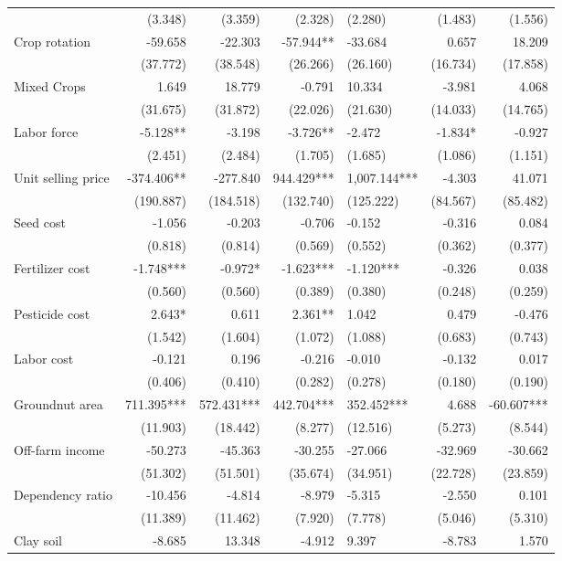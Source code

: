 \documentclass[
]{article}
\begin{document}
\begin{landscape}
\begin{longtable}[t]{lrrrlrr}
 & (3.348) & (3.359) & (2.328) & (2.280) & (1.483) & (1.556)\\
Crop rotation & -59.658 & -22.303 & -57.944** & -33.684 & 0.657 & 18.209\\
 & (37.772) & (38.548) & (26.266) & (26.160) & (16.734) & (17.858)\\
Mixed Crops & 1.649 & 18.779 & -0.791 & 10.334 & -3.981 & 4.068\\
 & (31.675) & (31.872) & (22.026) & (21.630) & (14.033) & (14.765)\\
Labor force & -5.128** & -3.198 & -3.726** & -2.472 & -1.834* & -0.927\\
 & (2.451) & (2.484) & (1.705) & (1.685) & (1.086) & (1.151)\\
Unit selling price & -374.406** & -277.840 & 944.429*** & 1,007.144*** & -4.303 & 41.071\\
 & (190.887) & (184.518) & (132.740) & (125.222) & (84.567) & (85.482)\\
Seed cost & -1.056 & -0.203 & -0.706 & -0.152 & -0.316 & 0.084\\
 & (0.818) & (0.814) & (0.569) & (0.552) & (0.362) & (0.377)\\
Fertilizer cost & -1.748*** & -0.972* & -1.623*** & -1.120*** & -0.326 & 0.038\\
 & (0.560) & (0.560) & (0.389) & (0.380) & (0.248) & (0.259)\\
Pesticide cost & 2.643* & 0.611 & 2.361** & 1.042 & 0.479 & -0.476\\
 & (1.542) & (1.604) & (1.072) & (1.088) & (0.683) & (0.743)\\
Labor cost & -0.121 & 0.196 & -0.216 & -0.010 & -0.132 & 0.017\\
 & (0.406) & (0.410) & (0.282) & (0.278) & (0.180) & (0.190)\\
Groundnut area & 711.395*** & 572.431*** & 442.704*** & 352.452*** & 4.688 & -60.607***\\
 & (11.903) & (18.442) & (8.277) & (12.516) & (5.273) & (8.544)\\
Off-farm income & -50.273 & -45.363 & -30.255 & -27.066 & -32.969 & -30.662\\
 & (51.302) & (51.501) & (35.674) & (34.951) & (22.728) & (23.859)\\
Dependency ratio & -10.456 & -4.814 & -8.979 & -5.315 & -2.550 & 0.101\\
 & (11.389) & (11.462) & (7.920) & (7.778) & (5.046) & (5.310)\\
Clay soil & -8.685 & 13.348 & -4.912 & 9.397 & -8.783 & 1.570\\

\end{longtable}
\end{landscape}
\end{document}
